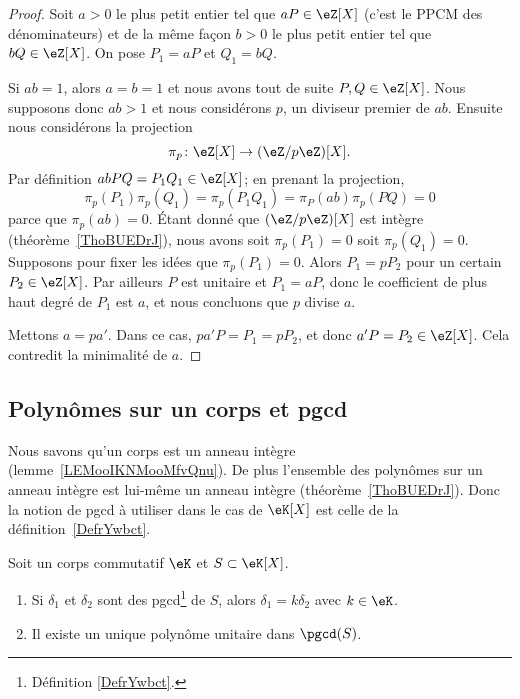 \begin{proof}
	Soit \( a>0\) le plus petit entier tel que \( aP\in\eZ[X]\) (c'est le PPCM des dénominateurs) et de la même façon \( b>0\) le plus petit entier tel que \( bQ\in \eZ[X]\). On pose \( P_1=aP\) et \( Q_1=bQ\).

	Si \( ab=1\), alors \( a=b=1\) et nous avons tout de suite \( P,Q\in \eZ[X]\). Nous supposons donc \( ab>1\) et nous considérons \( p\), un diviseur premier de \( ab\). Ensuite nous considérons la projection
	\begin{equation}
		\pi_p\colon \eZ[X]\to (\eZ/p\eZ)[X].
	\end{equation}
	Par définition \( abPQ=P_1Q_1\in \eZ[X]\); en prenant la projection,
	\begin{equation}
		\pi_p(P_1)\pi_p(Q_1)=\pi_p(P_1Q_1)=\pi_P(ab)\pi_p(PQ)=0
	\end{equation}
	parce que \( \pi_p(ab)=0\). Étant donné que \( (\eZ/p\eZ)[X]\) est intègre (théorème~\ref{ThoBUEDrJ}), nous avons soit \( \pi_p(P_1)=0\) soit \( \pi_p(Q_1)=0\). Supposons pour fixer les idées que \( \pi_p(P_1)=0\). Alors \( P_1=pP_2\) pour un certain \( P_2\in \eZ[X]\). Par ailleurs \( P\) est unitaire et \( P_1=aP\), donc le coefficient de plus haut degré de \( P_1\) est \( a\), et nous concluons que \( p\) divise \( a\).

	Mettons \( a=pa'\). Dans ce cas, \( pa'P=P_1=pP_2\), et donc \( a'P=P_2\in \eZ[X]\). Cela contredit la minimalité de \( a\).
\end{proof}

\subsection{Polynômes sur un corps et pgcd}

Nous savons qu'un corps est un anneau intègre (lemme~\ref{LEMooIKNMooMfvQnu}). De plus l'ensemble des polynômes sur un anneau intègre est lui-même un anneau intègre (théorème~\ref{ThoBUEDrJ}). Donc la notion de pgcd à utiliser dans le cas de \( \eK[X]\) est celle de la définition~\ref{DefrYwbct}.

\begin{lemma}      \label{LEMooXISOooNAMeVX}
	Soit un corps commutatif \( \eK\) et \( S\subset \eK[X]\).
	\begin{enumerate}
		\item
		      Si \( \delta_1\) et \( \delta_2\) sont des pgcd\footnote{Définition \ref{DefrYwbct}.} de \( S\), alors \( \delta_1=k\delta_2\) avec \( k\in \eK\).
		\item       \label{ITEMooARLJooOQvBcw}
		      Il existe un unique polynôme unitaire dans \( \pgcd(S)\).
	\end{enumerate}
\end{lemma}

